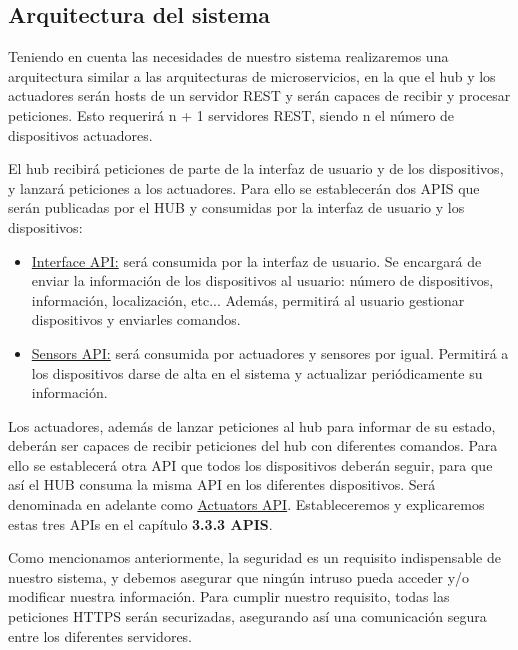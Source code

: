 \subsection{Arquitectura del sistema}
Teniendo en cuenta las necesidades de nuestro sistema realizaremos una arquitectura similar a las arquitecturas de microservicios,
en la que el hub y los actuadores serán hosts de un servidor REST y serán capaces de recibir y procesar peticiones.
Esto requerirá n + 1 servidores REST, siendo n el número de dispositivos actuadores.
\par
El hub recibirá peticiones de parte de la interfaz de usuario y de los dispositivos, y lanzará peticiones a los actuadores.
Para ello se establecerán dos APIS que serán publicadas por el HUB y consumidas por la interfaz de usuario y los dispositivos:
\begin{itemize}
\setlength\itemsep{6pt plus 1pt minus 1pt}
\item \underline{Interface API:} será consumida por la interfaz de usuario. Se encargará de enviar la información de los dispositivos al usuario: número
 de dispositivos, información, localización, etc... Además, permitirá al usuario gestionar dispositivos y enviarles comandos.
\item \underline{Sensors API:} será consumida por actuadores y sensores por igual. Permitirá a los dispositivos darse de alta en el sistema y actualizar
periódicamente su información.
\end{itemize}
\par
Los actuadores, además de lanzar peticiones al hub para informar de su estado, deberán ser capaces de recibir peticiones del hub con
diferentes comandos. Para ello se establecerá otra API que todos los dispositivos deberán seguir, para que así el HUB consuma la misma API
en los diferentes dispositivos. Será denominada en adelante como \underline{Actuators API}. Estableceremos y explicaremos estas tres APIs en el capítulo
\textbf{3.3.3 APIS}.
\par
Como mencionamos anteriormente, la seguridad es un requisito indispensable de nuestro sistema, y debemos asegurar que ningún intruso pueda acceder y/o modificar nuestra información.
Para cumplir nuestro requisito, todas las peticiones HTTPS serán securizadas, asegurando así una comunicación segura entre los diferentes servidores.

